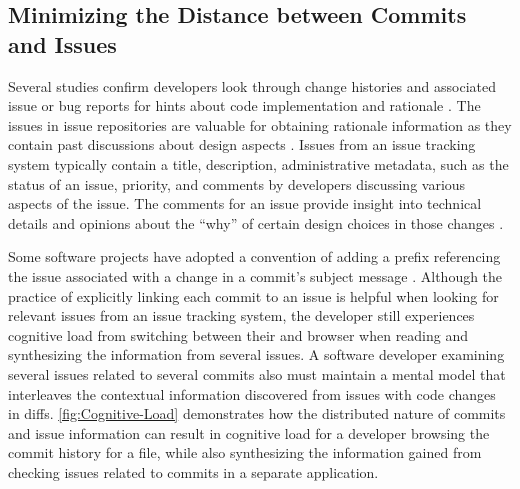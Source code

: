\subsection{Minimizing the Distance between Commits and Issues}
\label{subsec:Minimize-Commit-Issue-Distance}

Several studies confirm developers look through change histories and associated issue 
or bug reports for hints about code implementation and rationale \cite{ko_information_2007,robillard_turnover-induced_2021, rastkar_why_2013}.
The issues in issue repositories are valuable for obtaining rationale information 
as they contain past discussions about design aspects \cite{brunet_design_2014,hassan_road_2008}.
Issues from an issue tracking system typically contain a title, 
description, administrative metadata, such as the status of an issue, priority, 
and comments by developers discussing various aspects of the issue.
The comments for an issue provide insight into technical details 
and opinions about the ``why'' of certain design choices in those changes \cite{ortu_jira_2015}.

Some software projects have adopted a convention of adding a prefix referencing 
the issue associated with a change in a commit's subject message \cite{rastkar_why_2013,moreno_arena_2017}.
Although the practice of explicitly linking each commit to an issue is helpful when looking for relevant issues from an issue tracking system, 
the developer still experiences cognitive load from switching between their  and browser when reading and synthesizing the information from several issues.
A software developer examining several issues related to several commits also must maintain a mental model that interleaves the contextual information discovered from issues with code changes in diffs.
\autoref{fig:Cognitive-Load} demonstrates how the distributed nature of commits and issue information can result in cognitive load for a developer browsing the commit history for a file, while also synthesizing the information gained from checking issues related to commits in a separate application.

